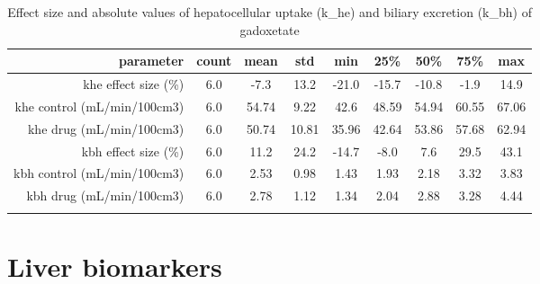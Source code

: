 \documentclass{epflreport}%
\begin{document}
%
\begin{longtable}{rcccccccc}%
\hline%
parameter&count&mean&std&min&25\%&50\%&75\%&max\\%
\hline%
khe effect size (\%)&6.0&{-}7.3&13.2&{-}21.0&{-}15.7&{-}10.8&{-}1.9&14.9\\%
khe control (mL/min/100cm3)&6.0&54.74&9.22&42.6&48.59&54.94&60.55&67.06\\%
khe drug (mL/min/100cm3)&6.0&50.74&10.81&35.96&42.64&53.86&57.68&62.94\\%
kbh effect size (\%)&6.0&11.2&24.2&{-}14.7&{-}8.0&7.6&29.5&43.1\\%
kbh control (mL/min/100cm3)&6.0&2.53&0.98&1.43&1.93&2.18&3.32&3.83\\%
kbh drug (mL/min/100cm3)&6.0&2.78&1.12&1.34&2.04&2.88&3.28&4.44\\%
\hline%
\caption{Effect size and absolute values of hepatocellular uptake (k\_he) and biliary excretion (k\_bh) of gadoxetate} \\%
\end{longtable}%
\clearpage%
\section{Liver biomarkers}%
\label{sec:Liverbiomarkers}%
\end{document}
